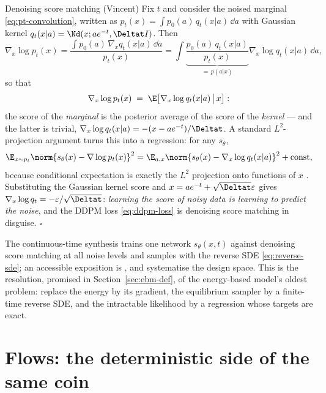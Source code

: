 \begin{toolbox}{Denoising score matching (Vincent)}
Fix $t$ and consider the noised marginal \eqref{eq:pt-convolution}, written
as $p_t(x) = \int p_0(a)\, q_t(x|a)\,\dd a$ with Gaussian kernel
$q_t(x|a) = \Nd(x; a e^{-t}, \Deltat I)$. Then
\begin{equation*}
  \nabla_x \log p_t(x)
  = \frac{\int p_0(a)\, \nabla_x q_t(x|a)\, \dd a}{p_t(x)}
  = \int \underbrace{\frac{p_0(a)\, q_t(x|a)}{p_t(x)}}_{=\,p(a|x)}
    \nabla_x \log q_t(x|a)\, \dd a ,
\end{equation*}
so that
\begin{equation*}
  \nabla_x \log p_t(x)
  \;=\; \E\big[ \nabla_x \log q_t(x|a) \,\big|\, x \big] :
\end{equation*}
the score of the \emph{marginal} is the posterior average of the score of
the \emph{kernel} --- and the latter is trivial,
$\nabla_x \log q_t(x|a) = -(x - a e^{-t})/\Deltat$. A standard
$L^2$-projection argument turns this into a regression: for any
$s_\theta$,
\begin{equation*}
  \E_{x \sim p_t} \norm{ s_\theta(x) - \nabla \log p_t(x) }^2
  = \E_{a, x} \norm{ s_\theta(x) - \nabla_x \log q_t(x|a) }^2
  + \text{const},
\end{equation*}
because conditional expectation is exactly the $L^2$ projection onto
functions of $x$ \citep{vincent2011connection}. Substituting the Gaussian
kernel score and $x = a e^{-t} + \sqrt{\Deltat}\varepsilon$ gives
$\nabla_x \log q_t = -\varepsilon / \sqrt{\Deltat}$: \emph{learning the
score of noisy data is learning to predict the noise}, and the DDPM loss
\eqref{eq:ddpm-loss} is denoising score matching in disguise.
\hfill$\square$
\end{toolbox}

The continuous-time synthesis \citep{song2019generative, song2021scorebased}
trains one network $s_\theta(x, t)$ against denoising score matching at all
noise levels and samples with the reverse SDE \eqref{eq:reverse-sde}; an
accessible exposition is \citet{song2021blog}, and
\citet{karras2022elucidating} systematise the design space. This is the
resolution, promised in Section~\ref{sec:ebm-def}, of the energy-based
model's oldest problem: \citeauthor{song2019generative} replace the energy
by its gradient, the equilibrium sampler by a finite-time reverse SDE, and
the intractable likelihood by a regression whose targets are exact.

\section{Flows: the deterministic side of the same coin}\label{sec:flows}

